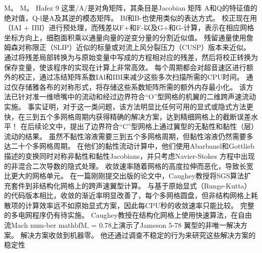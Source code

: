 \documentclass[UTF8,11pt,a4paper,openany,fontset=fandol]{ctexbook}
\begin{document}
M。 M。 Hafez 9 这里/A/是对角矩阵，其条目是Jacobian 矩阵 A和Q的特征值的绝对值，Q-l是A及其逆的模态矩阵。 Bf和B-也使用类似的表达方式。 校正现在用（IAI + IBI）进行预处理，而残差以F+和F-以及G+和G-计算，表示在相应网格坐标方向上，细胞面积乘以通量向量的逆变分量的分割近似值。 残留通量使用詹姆森对称限正（SLIP）近似的标量或对流上风分裂压力（CUSP）版本来近似。 通过将残差局部转换为与原始变量中写成的方程相对应的残差，然后将校正转换为保存变量，使该程序的实现在计算上非常高效。 每个周期都会对超音速区进行额外的校正，通过冻结矩阵系数IAl和IBI来减少这些多次扫描所需的CPU时间。 通过仅存储雅各布的对称形式，将存储这些系数矩阵所需的额外内存最小化。 该方法已针对准一维喷嘴中的流动和经过边界符合“O”型网格的机翼的二维跨声速流动实施。 事实证明，对于这一类问题，该方法明显比任何可用的显式或隐式方法更快，在三到五个多网格周期内获得精确的解决方案，达到精细网格上的截断误差水平！ 在后续论文中，提出了边界符合“C”型网格上通过翼型的无黏性和黏性（层）流动的结果。 虽然不黏性溶液需要三到五个多网格周期，但黏性溶液仍然需要多达二十个多网格周期。 在他们的黏性流动计算中，他们使用Abarbanel和Gottlieb描述的变换同时对称非黏性和黏性Jacobians，并只考虑Navier-Stokes 方程中出现的非混合二次导数的隐式处理。 收敛速率随着网格的高度拉伸而恶化，导致长宽比更大的网格单元。 在一篇刚刚提交出版的论文中，Caughey教授将SGS算法扩充套件到非结构化网格上的跨声速翼型计算。 与基于原始显式（Runge-Kutta）的代码版本相比，收敛的渐近率明显改善了，每个多网格圆盘，但非结构网格上耗散项的计算效率远不如原始显式方案，因此每CPU秒的收敛速率只能比较。 完整的多电网程序仍有待实施。 Caughey教授在结构化网格上使用快速算法，在自由流Mach num-ber mathbfM, = 0.78上演示了Jameson 5-78 翼型的非唯一解决方案。 解决方案收敛到机器零。 他还通过调查不稳定的行为来研究这些解决方案的稳定性
\end{document}
